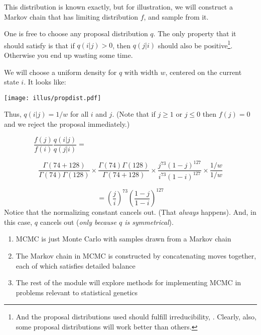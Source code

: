 This distribution is known exactly, but for illustration, we will construct a Markov chain that has limiting distribution $f$, and sample from it.

\enlargethispage*{1000pt}
One is free to choose any proposal distribution $q$.  The only property that it should satisfy is that if $q(i|j)>0$, then $q(j|i)$ should also be positive\footnote{And the proposal distributions used should fulfill irreducibility, \etc.  Clearly, also, some proposal distributions will work better than others. }.  Otherwise you end up wasting some time.  

We will choose a uniform density for $q$ with width $w$, centered on the current state $i$.  It looks like:
\begin{center}
\texttt{[image: illus/propdist.pdf]}
\end{center}
Thus, $q(i|j) = 1/w$ for all $i$ and $j$. (Note that if $j\geq1$ or $j\leq0$ then $f(j)=0$ and we reject the proposal immediately.)  

\[
	\frac{f(j)}{f(i)}\frac{q(i|j)}{q(j|i)} = ~~~~~~~~~~~~~~~~~~~~~~~~~~~~~~~~~~~~~~~~~~~~~~~~~~~~~~~~~~~~~~~~~~~~~~~~~~~~~~~~~~~~~~~~~~~
\]

\[
 \frac{\Gamma(74+128)}
	{\Gamma(74)\Gamma(128)}\times
	\frac{\Gamma(74)\Gamma(128)}{\Gamma(74+128)}\times
	\frac{j^{73} (1-j)^{127}}{i^{73} (1-i)^{127}}\times
	\frac{1/w}{1/w}
\]

\[
= \left(\frac{j}{i}\right)^{73} 
\left(\frac{1-j}{1-i}\right)^{127}
\]
Notice that the normalizing constant cancels out.  (That {\em always} happens).  And, in this case, $q$ cancels out ({\em only because $q$ is symmetrical}).


\begin{enumerate}
\item MCMC is just Monte Carlo with samples drawn from a Markov chain
\item The Markov chain in MCMC is constructed by concatenating moves together, each of which satisfies detailed balance
\item The rest of the module will explore methods for implementing MCMC in problems relevant to statistical genetics
\end{enumerate}



